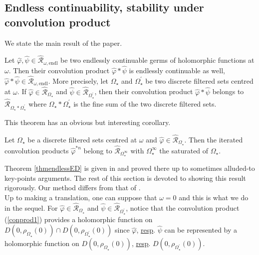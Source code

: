 \documentclass[11pt, english]{smfart}
\theoremstyle{definition}
\begin{document}
\subsection{Endless continuability, stability under convolution
  product}

We state the main result of the paper.

\begin{theo}\label{thmendlessED}
Let $\widehat{\varphi}, \widehat{\psi} \in  \hat{\mathscr{R}}_{\omega,
    \mathrm{endl}}$ be two endlessly continuable germs of holomorphic
  functions at $\omega$. Then their convolution product $\widehat{\varphi}
  \ast \widehat{\psi}$ is endlessly continuable as well, $\widehat{\varphi}
  \ast \widehat{\psi} \in  \hat{\mathscr{R}}_{\omega, \mathrm{endl}}$.
More precisely, let $\Omega_\star$ and
$\Omega_\star^\prime$ be two discrete filtered sets centred at
$\omega$. If $\widehat{\varphi} \in
\widehat{\mathscr{R}}_{\Omega_\star}$ and $\widehat{\psi} \in
\widehat{\mathscr{R}}_{\Omega_\star^\prime}$, 
then their convolution product  $\widehat{\varphi}
  \ast \widehat{\psi}$ belongs 
 to $\widehat{\mathscr{R}}_{\Omega_\star \ast \Omega_\star^\prime}$
 where $\Omega_\star \ast \Omega_\star^\prime$ is the  fine
sum of the two discrete filtered sets.
\end{theo}

This theorem has an obvious but interesting corollary.

\begin{coro}
Let $\Omega_\star$ be a discrete filtered sets centred at
$\omega$ and $\widehat{\varphi} \in
\widehat{\mathscr{R}}_{\Omega_\star}$. Then the iterated convolution
products $\widehat{\varphi}^{\ast n}$ belong to
$\widehat{\mathscr{R}}_{\Omega_\star^\infty}$ with
$\Omega_\star^\infty$ the saturated of $\Omega_\star$.
\end{coro}

Theorem \ref{thmendlessED} is given in \cite{CNP1} and proved
there up to sometimes alluded-to key-points arguments.
The rest of this section is devoted to showing  this result rigorously. Our method 
differs from that of \cite{CNP1}. \\
Up to making a translation, one can suppose that $\omega=0$ and this is what we do in
the sequel. For ${\widehat{\varphi} \in
\widehat{\mathscr{R}}_{\Omega_\star}}$ and $\widehat{\psi} \in
\widehat{\mathscr{R}}_{\Omega_\star^\prime}$, notice that the
convolution product (\ref{conprod1}) provides a holomorphic function
on ${D(0, \rho_{\Omega_\star}(0)) \cap D(0,
  \rho_{\Omega_\star^\prime}(0))}$ since $\widehat{\varphi}$,
\underline{resp}. $\widehat{\psi}$ can be represented by a holomorphic
function on $D(0, \rho_{\Omega_\star}(0))$, \underline{resp}. $D(0,
  \rho_{\Omega_\star^\prime}(0))$.
\end{document}
